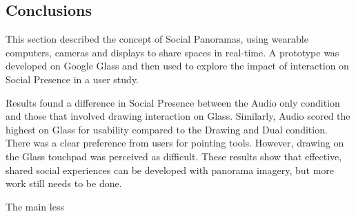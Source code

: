 
\subsection{Conclusions}

This section described the concept of Social Panoramas, using wearable computers, cameras and displays to share spaces in real-time. A prototype was developed on Google Glass and then used to explore the impact of interaction on Social Presence in a user study. 

Results found a difference in Social Presence between the Audio only condition and those that involved drawing interaction on Glass. Similarly, Audio scored the highest on Glass for usability compared to the Drawing and Dual condition. There was a clear preference from users for pointing tools. However, drawing on the Glass touchpad was perceived as difficult. These results show that effective, shared social experiences can be developed with panorama imagery, but more work still needs to be done.

The main less


